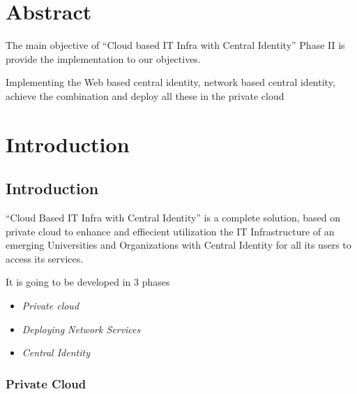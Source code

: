 \documentclass[12pt]{report}
\begin{document}
 
\chapter*{Abstract}
\setcounter{page}{1}
\normalsize
\hspace{0.5cm} The main objective of ``Cloud based IT Infra with Central Identity'' Phase II is provide the implementation to our objectives. \newline

Implementing the Web based central identity, network based central identity, achieve the combination and deploy all these in the private cloud \newline


\setcounter{page}{2}
\tableofcontents
\listoffigures
\listoftables
\pagebreak \thispagestyle{empty} \pagebreak

 
\setcounter{page}{1}


\chapter{Introduction}

\section{Introduction}
	``Cloud Based IT Infra with Central Identity'' is a complete solution, based on private cloud to enhance and effiecient utilization the IT Infrastructure of an emerging Universities and Organizations with Central Identity for all its users to access its services.\newline

	It is going to be developed in 3 phases 
	\begin{itemize}
		\item \textit{Private cloud} 
		\item \textit{Deploying Network Services} 
		\item \textit{Central Identity}
	\end{itemize}
	
\subsection{Private Cloud}
\end{document}
